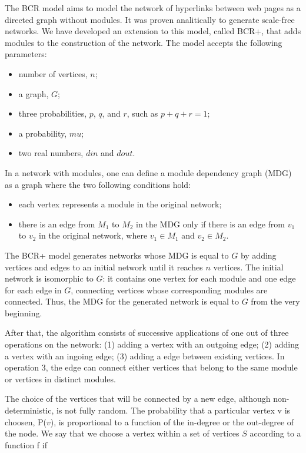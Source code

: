 The BCR model \cite{Bollobas2003} aims to model the network of hyperlinks
between web pages as a directed graph without modules. It was proven
analitically to generate scale-free networks. We have developed an extension to
this model, called BCR+, that adds modules to the construction of the network.
The model accepts the following parameters:

\begin{itemize}
\item number of vertices, $n$;
\item a graph, $G$;
\item three probabilities, $p$, $q$, and $r$, such as $p + q + r = 1$;
\item a probability, $mu$;
\item two real numbers, $din$ and $dout$.
\end{itemize}

In a network with modules, one can define a module dependency graph (MDG) as a
graph where the two following conditions hold: 

\begin{itemize}
\item each vertex represents a module in the original network; 
\item there is an edge from $M_1$ to $M_2$ in the MDG only if there is an edge
from $v_1$ to $v_2$ in the original network, where $v_1 \in M_1$ and $v_2 \in
M_2$.
\end{itemize}

The BCR+ model generates networks whose MDG is equal to $G$ by adding vertices
and edges to an initial network until it reaches $n$ vertices. The initial
network is isomorphic to $G$: it contains one vertex for each module and one
edge for each edge in $G$, connecting vertices whose corresponding modules are
connected. Thus, the MDG for the generated network is equal to $G$ from the very
beginning.

After that, the algorithm consists of successive applications of one out of
three operations on the network: (1) adding a vertex with an outgoing edge; (2)
adding a vertex with an ingoing edge; (3) adding a edge between existing
vertices. In operation 3, the edge can connect either vertices that belong
to the same module or vertices in distinct modules. 

The choice of the vertices that will be connected by a new edge, although
non-deterministic, is not fully random. The probability that a particular vertex
v is choosen, P($v$), is proportional to a function of the in-degree or the
out-degree of the node. We say that we choose a vertex within a set of vertices
$S$ according to a function f if

